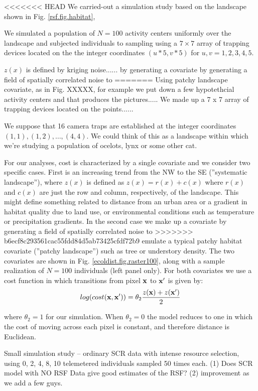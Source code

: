 <<<<<<< HEAD
We carried-out a simulation study based on the landscape
shown in  Fig. \ref{rsf.fig.habitat},

We simulated a population of $N=100$ activity centers uniformly over
the landscape and subjected individuals to sampling using 
a $7 \times 7$ array of trapping devices located on the 
the integer coordinates 
$(u*5,v*5)$ for $u,v = 1,2,3,4,5$.

 $z(x)$ is defined by kriging noise......
by generating a covariate by generating a field of spatially correlated noise to
=======
Using patchy landscape covariate, as in Fig. XXXXX, for example we put
down a few hypotethcial activity centers and that produces the pictures.....
We made up a 7 x 7 array of trapping devices located on the points......

We suppose that 16 camera traps are established at the integer coordinates
$(1,1), (1,2), \ldots, (4,4)$. We could think of this as a landscape
within which we're studying a population of ocelots, lynx or some
other cat.

For our analyses, cost is characterized by a single covariate
and we consider two specific cases. First is an increasing trend from
the NW to the SE (''systematic landscape''), where $z(x)$ is defined as
$z(x) = r(x) + c(x)$ where $r(x)$ and $c(x)$ are just the row and
column, respectively, of the landscape.  This might define something
related to distance from an urban area or a gradient in habitat
quality due to land use, or environmental conditions such as
temperature or precipitation gradients.  In the second case we make up
a covariate by generating a field of spatially correlated noise to
>>>>>>> b6ecf8c293561cac55fdd84d5ab73425cfdf72b9
emulate a typical patchy habitat covariate (''patchy landscape'') such as
tree or understory density. The two covariates are shown in
Fig. \ref{ecoldist.fig.raster100}, along with a sample realization of
$N=100$ individuals (left panel only).  For both covariates we use a
cost function in which transitions from pixel ${\bf x}$ to ${\bf x}'$
is given by:
\[
 log(cost({\bf x},{\bf x}'))=  \theta_2 \frac{z({\bf x}) + z({\bf x}')}{2}
\]

{\flushleft where} $\theta_2 = 1$ for our simulation.
When $\theta_2=0$ the
model reduces to one in which the cost of moving across each pixel is
constant, and therefore distance is Euclidean.

Small simulation study -- ordinary SCR data with intense resource selection,
using 0, 2, 4, 8, 10 telemetered individuals sampled 50 times each.
(1) Does SCR model with NO RSF Data give good estimates of the RSF?
(2) improvement as we add a few guys.


